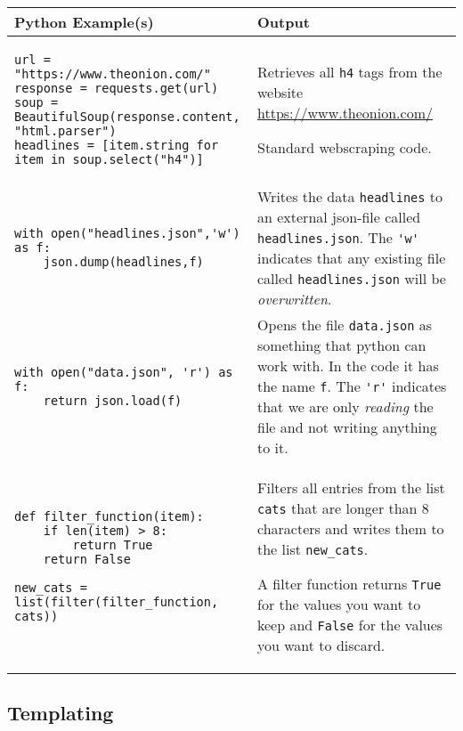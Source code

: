 \documentclass[11pt,a4paper]{report}
\begin{document}
\begin{longtable}{|p{}|p{}|}
\hline
Python  Example(s) & Output  \\
\hline 
\endhead
 \begin{lstlisting}
url = "https://www.theonion.com/"
response = requests.get(url)
soup = BeautifulSoup(response.content, "html.parser")
headlines = [item.string for item in soup.select("h4")]
\end{lstlisting}  & Retrieves all \verb|h4| tags from the website \url{https://www.theonion.com/}

Standard webscraping code. \\
\hline
\begin{lstlisting}
with open("headlines.json",'w') as f:
    json.dump(headlines,f)
\end{lstlisting} &
Writes the data \verb|headlines| to an external json-file called \verb|headlines.json|. The \verb|'w'| indicates that any existing file called \verb|headlines.json| will be \emph{overwritten}.\\
\hline
\begin{lstlisting}
with open("data.json", 'r') as f:
    return json.load(f)
\end{lstlisting} &
Opens the file \verb|data.json| as something that python can work with. In the code it has the name \verb|f|. The \verb|'r'| indicates that we are only \emph{reading} the file and not writing anything to it. \\
\hline
\begin{lstlisting}
def filter_function(item):
    if len(item) > 8:
        return True
    return False

new_cats = list(filter(filter_function, cats))
\end{lstlisting} &
Filters all entries from the list \verb|cats| that are longer than $8$ characters and writes  them to the list \verb|new_cats|.

A filter function returns \verb|True| for the values you want to keep and \verb|False| for the values you want to discard. \\
\hline

\end{longtable}

\subsection{Templating}
\end{document}
